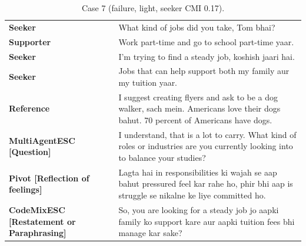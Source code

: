 \begin{table}[t]
\centering\footnotesize
\caption{Case 7 (failure, light, seeker CMI 0.17).}
\label{tab:case7}
\begin{tabular}{@{}p{}p{}@{}}
\toprule
\textbf{Seeker} & What kind of jobs did you take, Tom bhai? \\
\textbf{Supporter} & Work part-time and go to school part-time yaar. \\
\textbf{Seeker} & I'm trying to find a steady job, koshish jaari hai. \\
\textbf{Seeker} & Jobs that can help support both my family aur my tuition yaar. \\
\textbf{Reference} & I suggest creating flyers and ask to be a dog walker, sach mein. Americans love their dogs bahut. 70 percent of Americans have dogs. \\
\textbf{MultiAgentESC [Question]} & I understand, that is a lot to carry. What kind of roles or industries are you currently looking into to balance your studies? \\
\textbf{Pivot [Reflection of feelings]} & Lagta hai in responsibilities ki wajah se aap bahut pressured feel kar rahe ho, phir bhi aap is struggle se nikalne ke liye committed ho. \\
\textbf{CodeMixESC [Restatement or Paraphrasing]} & So, you are looking for a steady job jo aapki family ko support kare aur aapki tuition fees bhi manage kar sake? \\
\bottomrule
\end{tabular}
\end{table}

